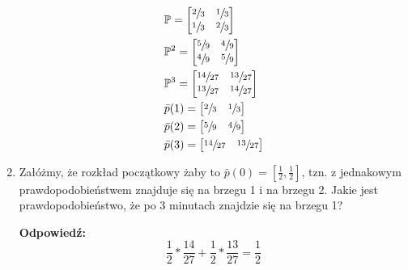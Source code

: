 \documentclass[a4paper,12pt]{article}
\theoremstyle{definition}%
\theoremstyle{definition}
\theoremstyle{problem}
\begin{document}
\begin{enumerate}[label=\alph*)]
\begin{multicols}{2}
\begin{align*}
&\mathbb{P}=\begin{bmatrix}
\sfrac{2}{3}&\sfrac{1}{3}\\
\sfrac{1}{3}&\sfrac{2}{3}
\end{bmatrix}\\
&\mathbb{P}^2=\begin{bmatrix}
\sfrac{5}{9}&\sfrac{4}{9}\\
\sfrac{4}{9}&\sfrac{5}{9}
\end{bmatrix}\\
&\mathbb{P}^3=\begin{bmatrix}
\sfrac{14}{27}&\sfrac{13}{27}\\
\sfrac{13}{27}&\sfrac{14}{27}
\end{bmatrix}\\
&\bar{p}(1)=\begin{bmatrix}
\sfrac{2}{3}&\sfrac{1}{3}
\end{bmatrix}\\
&\bar{p}(2)=\begin{bmatrix}
\sfrac{5}{9}&\sfrac{4}{9}
\end{bmatrix}\\
&\bar{p}(3)=\begin{bmatrix}
\sfrac{14}{27}&\sfrac{13}{27}
\end{bmatrix}
\end{align*}
\end{multicols}
\item Załóżmy, że rozkład początkowy żaby to $\bar{p}(0) = \left[ \frac{1}{2}, \frac{1}{2}\right]$, tzn. z jednakowym prawdopodobieństwem znajduje się na brzegu 1 i na brzegu 2. Jakie jest prawdopodobieństwo, że po 3 minutach znajdzie się na brzegu 1?

\textbf{Odpowiedź: }
$$\frac{1}{2}*\frac{14}{27}+\frac{1}{2}*\frac{13}{27}=\frac{1}{2}$$
\end{enumerate}
\end{document}
